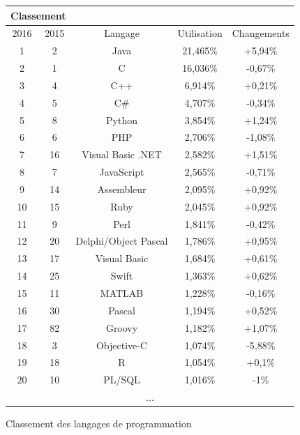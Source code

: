 \documentclass[a4paper,12pt]{article}
\begin{document}
\newpage
\begin{figure}[h]

\begin{center}

\begin{tabular}{|c|c|c|c|c|}

\cline{1-2}
\multicolumn{2}{|c|}{Classement} \\
\hline
2016 & 2015 & Langage & Utilisation & Changements \\
\hline 
1 & 2 & Java & 21,465\% & +5,94\% \\
\hline 
2 & 1 & C & 16,036\% & -0,67\% \\
\hline
3 & 4 & C++ & 6,914\% & +0,21\% \\
\hline
4 & 5 & C\# & 4,707\% & -0,34\% \\
\hline
5 & 8 & Python & 3,854\% & +1,24\% \\
\hline
6 & 6 & PHP & 2,706\% & -1,08\% \\
\hline
7 & 16 & Visual Basic .NET & 2,582\% & +1,51\% \\
\hline
8 & 7 & JavaScript & 2,565\% & -0,71\% \\
\hline
9 & 14 & Assembleur & 2,095\% & +0,92\% \\
\hline
10 & 15 & Ruby & 2,045\% & +0,92\% \\
\hline
11 & 9 & Perl & 1,841\% &  -0,42\% \\
\hline
12 & 20 & Delphi/Object Pascal & 1,786\% & +0,95\% \\
\hline
13 & 17 & Visual Basic & 1,684\% & +0,61\% \\
\hline
14 & 25 & Swift & 1,363\% & +0,62\% \\
\hline
15 & 11 & MATLAB & 1,228\% & -0,16\% \\
\hline
16 & 30 & Pascal & 1,194\% & +0,52\% \\
\hline
17 & 82 & Groovy & 1,182\% & +1,07\% \\
\hline
18 & 3 & Objective-C & 1,074\% & -5,88\% \\
\hline
19 & 18 & R & 1,054\% & +0,1\% \\
\hline
20 & 10 & PL/SQL & 1,016\% & -1\% \\
\hline
\multicolumn{5}{|c|}{...} \\
\hline

\end{tabular}

\end{center}
\label{ranking}
\caption{Classement des langages de programmation}


\end{figure}
\end{document}
